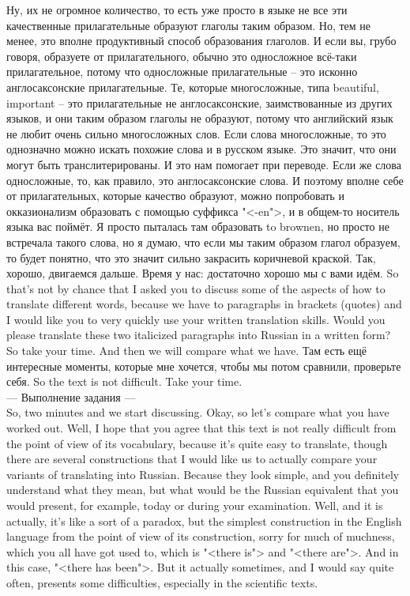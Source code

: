 \documentclass[main.tex]{subfiles}
\begin{document}
Ну, их не огромное количество, то есть уже просто в языке не все эти качественные прилагательные образуют глаголы таким образом.
Но, тем не менее, это вполне продуктивный способ образования глаголов.
И если вы, грубо говоря, образуете от прилагательного, обычно это односложное всё-таки прилагательное, потому что односложные прилагательные -- это исконно англосаксонские прилагательные.
Те, которые многосложные, типа beautiful, important -- это прилагательные не англосаксонские, заимствованные из других языков, и они таким образом глаголы не образуют, потому что английский язык не любит очень сильно многосложных слов.
Если слова многосложные, то это однозначно можно искать похожие слова и в русском языке.
Это значит, что они могут быть транслитерированы.
И это нам помогает при переводе.
Если же слова односложные, то, как правило, это англосаксонские слова.
И поэтому вполне себе от прилагательных, которые качество образуют, можно попробовать и окказионализм образовать с помощью суффикса "<-en">, и в общем-то носитель языка вас поймёт.
Я просто пыталась там образовать to brownen, но просто не встречала такого слова, но я думаю, что если мы таким образом глагол образуем, то будет понятно, что это значит сильно закрасить коричневой краской.
Так, хорошо, двигаемся дальше.
Время у нас: достаточно хорошо мы с вами идём.
So that's not by chance that I asked you to discuss some of the aspects of how to translate different words, because we have to paragraphs in brackets (quotes) and I would like you to very quickly use your written translation skills.
Would you please translate these two italicized paragraphs into Russian in a written form?
So take your time.
And then we will compare what we have.
Там есть ещё интересные моменты, которые мне хочется, чтобы мы потом сравнили, проверьте себя.
So the text is not difficult.
Take your time.
\\

--- Выполнение задания ---
\\

So, two minutes and we start discussing.
Okay, so let's compare what you have worked out.
Well, I hope that you agree that this text is not really difficult from the point of view of its vocabulary, because it's quite easy to translate, though there are several constructions that I would like us to actually compare your variants of translating into Russian.
Because they look simple, and you definitely understand what they mean, but what would be the Russian equivalent that you would present, for example, today or during your examination.
Well, and it is actually, it's like a sort of a paradox, but the simplest construction in the English language from the point of view of its construction, sorry for much of muchness, which you all have got used to, which is "<there is"> and "<there are">.
And in this case, "<there has been">.
But it actually sometimes, and I would say quite often, presents some difficulties, especially in the scientific texts.
\end{document}
